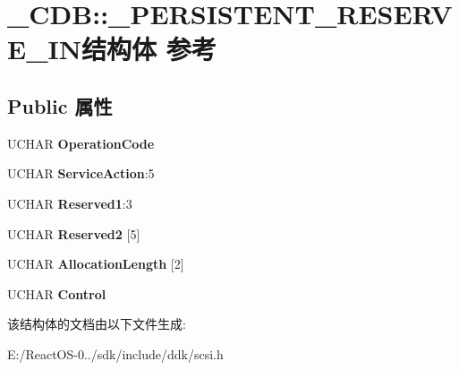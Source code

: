\hypertarget{struct___c_d_b_1_1___p_e_r_s_i_s_t_e_n_t___r_e_s_e_r_v_e___i_n}{}\section{\+\_\+\+C\+DB\+:\+:\+\_\+\+P\+E\+R\+S\+I\+S\+T\+E\+N\+T\+\_\+\+R\+E\+S\+E\+R\+V\+E\+\_\+\+I\+N结构体 参考}
\label{struct___c_d_b_1_1___p_e_r_s_i_s_t_e_n_t___r_e_s_e_r_v_e___i_n}
\subsection*{Public 属性}
\begin{DoxyCompactItemize}
\item 
\mbox{\label{struct___c_d_b_1_1___p_e_r_s_i_s_t_e_n_t___r_e_s_e_r_v_e___i_n_a4f9d3ceef2e0c421fc7b77067299b2b7}} 
U\+C\+H\+AR {\bfseries Operation\+Code}
\item 
\mbox{\label{struct___c_d_b_1_1___p_e_r_s_i_s_t_e_n_t___r_e_s_e_r_v_e___i_n_a48b19270f8ba95c93d224538fa90a4d5}} 
U\+C\+H\+AR {\bfseries Service\+Action}\+:5
\item 
\mbox{\label{struct___c_d_b_1_1___p_e_r_s_i_s_t_e_n_t___r_e_s_e_r_v_e___i_n_a8584bfd38d7749fa60bcfd0d9d658c18}} 
U\+C\+H\+AR {\bfseries Reserved1}\+:3
\item 
\mbox{\label{struct___c_d_b_1_1___p_e_r_s_i_s_t_e_n_t___r_e_s_e_r_v_e___i_n_ac290d61417639d7a081c651cbae4e42d}} 
U\+C\+H\+AR {\bfseries Reserved2} \mbox{[}5\mbox{]}
\item 
\mbox{\label{struct___c_d_b_1_1___p_e_r_s_i_s_t_e_n_t___r_e_s_e_r_v_e___i_n_ae9f20df8ce2e66e41bdf94752c3fafd9}} 
U\+C\+H\+AR {\bfseries Allocation\+Length} \mbox{[}2\mbox{]}
\item 
\mbox{\label{struct___c_d_b_1_1___p_e_r_s_i_s_t_e_n_t___r_e_s_e_r_v_e___i_n_a0e5dc94866f6196040484600b279aaba}} 
U\+C\+H\+AR {\bfseries Control}
\end{DoxyCompactItemize}


该结构体的文档由以下文件生成\+:\begin{DoxyCompactItemize}
\item 
E\+:/\+React\+O\+S-\/0../sdk/include/ddk/scsi.\+h\end{DoxyCompactItemize}
